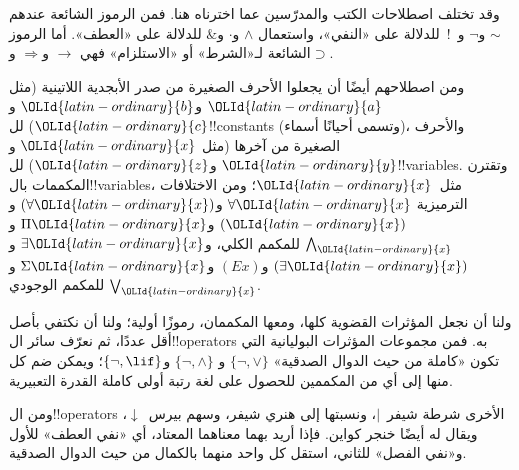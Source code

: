 \documentclass[../../../include/open-logic-section]{subfiles}
\begin{document}
\begin{intro}
وقد تختلف اصطلاحات الكتب والمدرّسين عما اخترناه هنا. فمن الرموز
الشائعة عندهم $\sim$ و$\neg$ و~!\ للدلالة على
«النفي»، واستعمال $\wedge$ و$\cdot$ و$\&$ للدلالة على «العطف». أما
الرموز الشائعة لـ«الشرط» أو «الاستلزام» فهي $\rightarrow$
و$\Rightarrow$ و$\supset$.

ومن اصطلاحهم أيضًا أن يجعلوا الأحرف الصغيرة من صدر الأبجدية اللاتينية (مثل
$\OLId{latin-ordinary}{a}$ و$\OLId{latin-ordinary}{b}$ و$\OLId{latin-ordinary}{c}$) لل!!{constant}s (وتسمى أحيانًا أسماء)، والأحرف
الصغيرة من آخرها (مثل $\OLId{latin-ordinary}{x}$ و$\OLId{latin-ordinary}{y}$ و$\OLId{latin-ordinary}{z}$) لل!!{variable}s. وتقترن
المكممات بال!!{variable}s، مثل~$\OLId{latin-ordinary}{x}$؛ ومن الاختلافات الترميزية
$\forall \OLId{latin-ordinary}{x}$ و$(\forall \OLId{latin-ordinary}{x})$ و$(\OLId{latin-ordinary}{x})$ و$\Pi \OLId{latin-ordinary}{x}$ و$\bigwedge_\OLId{latin-ordinary}{x}$ للمكمم
الكلي، و$\exists \OLId{latin-ordinary}{x}$ و$(\exists \OLId{latin-ordinary}{x})$ و$(Ex)$ و$\Sigma \OLId{latin-ordinary}{x}$ و
$\bigvee_\OLId{latin-ordinary}{x}$ للمكمم الوجودي.
\end{intro}

\begin{explain}
ولنا أن نجعل المؤثرات القضوية كلها، ومعها المكممان، رموزًا أولية؛
ولنا أن نكتفي بأصل أقل عددًا، ثم نعرّف سائر
ال!!{operator}s به. فمن مجموعات المؤثرات البوليانية التي تكون
«كاملة من حيث الدوال الصدقية» $\{ \lnot, \lor \}$ و
$\{ \lnot, \land \}$ و$\{ \lnot, \lif\}$؛ ويمكن ضم كل منها إلى أي
من المكممين للحصول على لغة رتبة أولى كاملة القدرة التعبيرية.

ومن ال!!{operator}s الأخرى شرطة شيفر~$|$، ونسبتها إلى
هنري شيفر، وسهم بيرس~$\downarrow$، ويقال له أيضًا خنجر كواين.
فإذا أريد بهما معناهما المعتاد، أي «نفي العطف» للأول و«نفي الفصل»
للثاني، استقل كل واحد منهما بالكمال من حيث الدوال الصدقية.
\end{explain}
\end{document}
